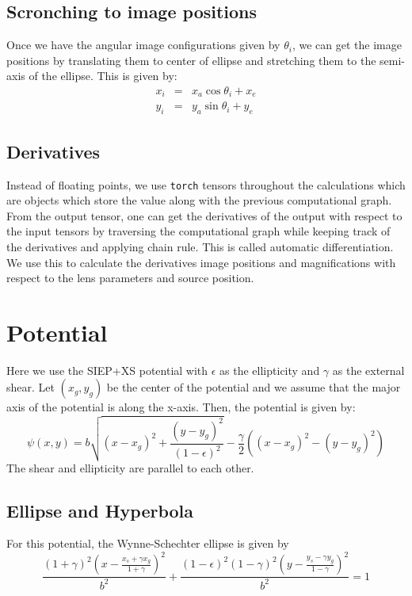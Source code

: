 \documentclass{article}
\begin{document}
\subsection{Scronching to image positions}
Once we have the angular image configurations given by $\theta_i$, we can get the image positions by translating them to center of ellipse and stretching them to the semi-axis of the ellipse. This is given by:
\begin{eqnarray}
    x_i &=& x_a\cos\theta_i + x_e \\
    y_i &=& y_a\sin\theta_i + y_e
\end{eqnarray}

\subsection{Derivatives}
Instead of floating points, we use \texttt{torch} tensors throughout the calculations which are objects which store the value along with the previous computational graph. From the output tensor, one can get the derivatives of the output with respect to the input tensors by traversing the computational graph while keeping track of the derivatives and applying chain rule. This is called automatic differentiation. We use this to calculate the derivatives image positions and magnifications with respect to the lens parameters and source position.


\section{Potential}
Here we use the SIEP+XS potential with $\epsilon$ as the ellipticity and $\gamma$ as the external shear. Let $(x_g, y_g)$ be the center of the potential and we assume that the major axis of the potential is along the x-axis. Then, the potential is given by:
\begin{equation}
    \psi(x,y) = b\sqrt{(x-x_g)^2 + \frac{(y-y_g)^2}{(1-\epsilon)^2}} - \frac{\gamma}{2}\left((x-x_g)^2 - (y-y_g)^2\right)
\end{equation}
The shear and ellipticity are parallel to each other.

\subsection{Ellipse and Hyperbola}
For this potential, the Wynne-Schechter ellipse is given by
$$ \frac{(1+\gamma)^2\left(x - \frac{x_s+\gamma x_g}{1+\gamma}\right)^2}{b^2} + \frac{(1-\epsilon)^2(1-\gamma)^2\left(y - \frac{y_s-\gamma y_g}{1-\gamma}\right)^2}{b^2} = 1 $$
\end{document}
